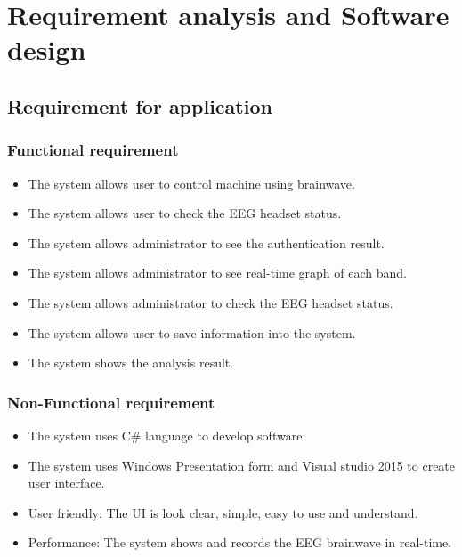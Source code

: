 \chapter{Requirement analysis and Software design}

\label{ch:Requirement analysis and Software design}

\setlength{\parindent}{4em}
\setlength{\parskip}{1em}
\renewcommand{\baselinestretch}{1.5}

\section{Requirement for application}

\subsection{Functional requirement}
\begin{itemize}
	\item The system allows user to control machine using brainwave.
    \item The system allows user to check the EEG headset status.
    \item The system allows administrator to see the authentication result.
    \item The system allows administrator to see real-time graph of each band.
    \item The system allows administrator to check the EEG headset status.
    \item The system allows user to save information into the system.
    \item The system shows the analysis result.
\end{itemize}  

\subsection{Non-Functional requirement}
\begin{itemize}
	\item The system uses C\# language to develop software.
    \item The system uses Windows Presentation form and Visual studio 2015 to create user interface.
    \item User friendly: The UI is look clear, simple, easy to use and understand.
    \item Performance: The system shows and records the EEG brainwave in real-time.
\end{itemize}

